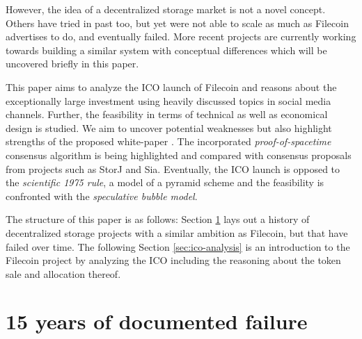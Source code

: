 \documentclass[journal]{IEEEtran}
\begin{document}
However, the idea of a decentralized storage market is not a novel concept.
Others\cite{tribler}\cite{mojo-nation} have tried in past too, but yet were not able to scale as much as Filecoin advertises to do, and eventually failed.
More recent projects\cite{storj}\cite{sia} are currently working towards building a similar system with conceptual differences which will be uncovered briefly in this paper.

This paper aims to analyze the ICO launch of Filecoin and reasons about the exceptionally large investment using heavily discussed topics in social media channels.
Further, the feasibility in terms of technical as well as economical design is studied.
We aim to uncover potential weaknesses but also highlight strengths of the proposed white-paper \cite{filecoin}.
The incorporated \textit{proof-of-spacetime} consensus algorithm is being highlighted and compared with consensus proposals from projects such as StorJ and Sia.
Eventually, the ICO launch is opposed to the \textit{scientific 1975 rule}, a model of a pyramid scheme\cite{pyramid-scheme} and the feasibility is confronted with the \textit{speculative bubble model}\cite{bubble}.

The structure of this paper is as follows: Section \ref{sec:documented-failure} lays out a history of decentralized storage projects with a similar ambition as Filecoin, but that have failed over time. 
The following Section \ref{sec:ico-analysis} is an introduction to the Filecoin project by analyzing the ICO including the reasoning about the token sale and allocation thereof.


\section{15 years of documented failure}
\label{sec:documented-failure}
\end{document}
